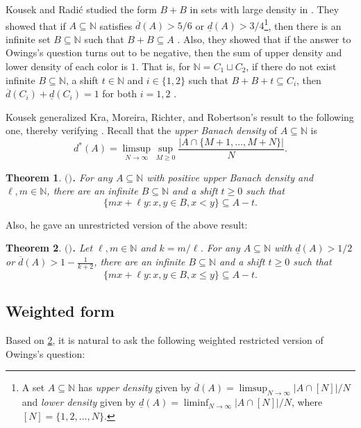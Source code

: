 \documentclass[reqno,12pt]{amsart}
\newtheorem{thm}{Theorem}[section]
\def \N {\mathbb N}
\numberwithin{equation}{section}
\begin{document}


Kousek and Radi{\'c} studied the form $B+B$ in sets with large density in \cite{KousekRadic24}. They showed that if $A\subseteq \N$ satisfies $\overline{d}(A)>5/6$ or $\underline{d}(A)>3/4$\footnote{A set $A\subseteq \N$ has {\em upper density} given by $\overline{d}(A)=\limsup_{N\to\infty}{|A\cap [N]|}/{N}$ and {\em lower density} given by $\underline{d}(A)=\liminf_{N\to\infty}{|A\cap [N]|}/{N}$, where $[N]=\{1,2,\ldots, N\}$.}, then there is an infinite set $B\subseteq \N$ such that $B+B\subseteq A$ \cite[Theorem~1.2]{KousekRadic24}. Also, they showed that if the answer to Owings's question turns out to be negative, then the sum of upper density and lower density of each color is $1$. That is, for $\N=C_1\sqcup C_2$, if there do not exist infinite $B\subseteq \N$, a shift $t\in \N$ and $i\in \{1,2\}$ such that $B+B+t\subseteq C_i$, then $\overline{d}(C_i)+\underline{d}(C_i)=1$ for both $i=1,2$ \cite[Proposition~6.3]{KousekRadic24}.


Kousek generalized Kra, Moreira, Richter, and Robertson's result to the
following one, thereby verifying
\cite[Conjecture~3.10]{KraMoreiraRichterRobertson25-1}. Recall that the
\emph{upper Banach density} of $A\subseteq\N$ is
\[
 d^*(A)=\limsup_{N\to\infty}\sup_{M\geq0}
 \frac{|A\cap\{M+1,\ldots,M+N\}|}{N}.
\]
\begin{thm}\label{thm:Kousek-shifted-weighted}
	$($\cite[Theorem~1.2]{Kousek25}$)${\bf .} For any $A\subseteq \N$ with positive upper Banach density and $\ell, m\in \N$, there are an infinite $B\subseteq \N$ and a shift $t\ge 0$ such that
	$$\{m x+\ell y:x,y\in B,x< y\}\subseteq A-t.$$
\end{thm}

Also, he gave an unrestricted version of the above result:

\begin{thm}\label{thm1-1}
	$($\cite[Theorems~1.6 and 1.7]{Kousek25}$)${\bf .} Let $\ell,m\in \N$ and $k=m/\ell$. For any $A\subseteq \N$ with $\underline{d}(A)>1/2$ or $\overline{d}(A)>1-\frac{1}{k+2}$, there are an infinite $B\subseteq \N$ and a shift $t\ge 0$ such that
	$$\{mx+\ell y:x,y\in B,x\le y\}\subseteq A-t.$$
\end{thm}

\subsection{Weighted form}
Based on \cref{thm1-1}, it is natural to ask the following weighted restricted version of Owings's question:
\end{document}
